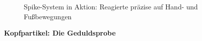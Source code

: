 \begin{figure}[htbp]
    \centering
    \caption{Spike-System in Aktion: Reagierte präzise auf Hand- und Fußbewegungen}
    \label{fig:spike_action}
\end{figure}

\newpage

\textbf{Kopfpartikel: Die Geduldsprobe}

